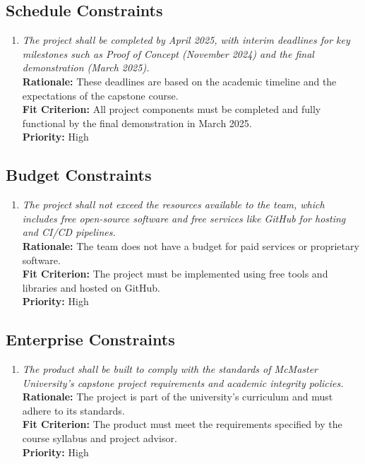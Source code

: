 \documentclass[12pt]{article}
\begin{document}
\subsection{Schedule Constraints}
\begin{enumerate}[label=SC \arabic*., wide=0pt, leftmargin=*]
    \item \emph{The project shall be completed by April 2025, with interim deadlines for key milestones such as Proof of Concept (November 2024) and the final demonstration (March 2025).}\\
    {\bf Rationale:} These deadlines are based on the academic timeline and the expectations of the capstone course.\\
    {\bf Fit Criterion:} All project components must be completed and fully functional by the final demonstration in March 2025.\\
    {\bf Priority:} High
\end{enumerate}
\subsection{Budget Constraints}
\begin{enumerate}[label=BC \arabic*., wide=0pt, leftmargin=*]
    \item \emph{The project shall not exceed the resources available to the team, which includes free open-source software and free services like GitHub for hosting and CI/CD pipelines.}\\
    {\bf Rationale:} The team does not have a budget for paid services or proprietary software.\\
    {\bf Fit Criterion:} The project must be implemented using free tools and libraries and hosted on GitHub.\\
    {\bf Priority:} High
\end{enumerate}
\subsection{Enterprise Constraints}
\begin{enumerate}[label=EC \arabic*., wide=0pt, leftmargin=*]
    \item \emph{The product shall be built to comply with the standards of McMaster University’s capstone project requirements and academic integrity policies.}\\
    {\bf Rationale:} The project is part of the university’s curriculum and must adhere to its standards.\\
    {\bf Fit Criterion:} The product must meet the requirements specified by the course syllabus and project advisor.\\
    {\bf Priority:} High
\end{enumerate}
\end{document}
